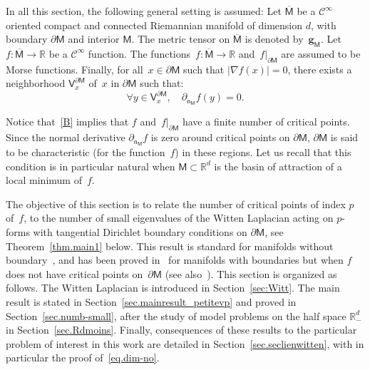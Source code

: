 \documentclass[10pt]{amsart}
\newcommand{\mbf}[1]{\mathbf{#1}}
\let\pa\partial
\theoremstyle{plain}
\theoremstyle{definition}
\newenvironment{manualassumption}[1]{%
\renewcommand\themanualassumptioninner{#1}%
\manualassumptioninner}{\endmanualassumptioninner}
\begin{document}
In all this section, the following general setting is assumed:
\begin{manualassumption}{$(\mathsf M$-$f)$}\label{B}
Let $\overline{\mathsf M}$ be a $\mathcal C^{\infty}$ oriented compact
and connected Riemannian manifold of dimension $d$, with boundary
$\partial \mathsf M$ and interior $\mathsf M$. The metric tensor on
$\overline{\mathsf M}$ is denoted by~$\mbf g_{\mathsf M}$. Let $f:
\overline{\mathsf M} \to \mathbb R$ be a $\mathcal C^{\infty}$
function. The functions~$f: \overline{\mathsf M} \to \mathbb R$
and~$f|_{\partial \mathsf M}$ are assumed to be Morse functions. Finally, for all~$x\in \pa \mathsf M$ such that $\vert \nabla f(x)\vert =0$, there exists a neighborhood $\mathsf V_x^{\pa \mathsf M}$ of~$x$ in $\pa \mathsf M$ such that:\vspace*{-3pt}
\[
\forall y\in \mathsf V_x^{\pa \mathsf M}, \quad \partial_{\mathsf n_{ \mathsf M}}f(y)=0.
\]
\end{manualassumption}

Notice that~\ref{B} implies that $f$ and~$f|_{\partial \mathsf M}$ have a finite number of
critical points. Since the normal derivative $\partial_{\mathsf n_{ \mathsf M}}f$ is zero around critical
points on $\pa \mathsf M$, $\pa \mathsf M$ is said
to be characteristic (for the function~$f$) in these regions. Let us
recall that this condition is in particular natural when $\mathsf M\subset \mathbb R^d$ is the basin of attraction of a local minimum of~$f$.

The objective of this section is to relate the number of critical
points of index $p$ of~$f$, to the number of small
eigenvalues of the Witten Laplacian acting on $p$-forms with
tangential Dirichlet boundary conditions on $\pa \mathsf M$, see
Theorem~\ref{thm.main1} below. This result is standard for manifolds
without
boundary~\cite{witten-82,helffer-sjostrand-85,simon1983semiclassical,herau-hitrick-sjostrand-11},
and has been proved in~\cite[Th.\,3.2.3]{helffer-nier-06} for manifolds with
boundaries but when $f$ does not have critical points on~$\pa \mathsf M$ (see
also~\cite{laudenbach2011morse,le-peutrec-10}). This section is organized
as follows. The Witten Laplacian is introduced in
Section~\ref{sec:Witt}. The main result is stated in
Section~\ref{sec.mainresult_petitevp} and proved in
Section~\ref{sec.numb-small}, after the study of model problems on the
half space $\mathbb R^d_-$ in Section~\ref{sec.Rdmoins}. Finally, consequences of these results
to the particular problem of interest in this work are detailed in
Section~\ref{sec.seclienwitten}, with in particular the proof of~\eqref{eq.dim-no}.
\end{document}
